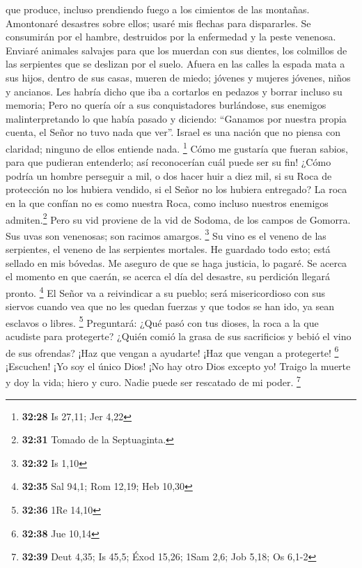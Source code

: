 que produce, incluso prendiendo fuego a los cimientos de las montañas.
 Amontonaré desastres sobre ellos; usaré mis flechas para
dispararles.  Se consumirán por el hambre, destruidos por
la enfermedad y la peste venenosa. Enviaré animales salvajes para que
los muerdan con sus dientes, los colmillos de las serpientes que se
deslizan por el suelo.  Afuera en las calles la espada
mata a sus hijos, dentro de sus casas, mueren de miedo; jóvenes y
mujeres jóvenes, niños y ancianos.  Les habría dicho que
iba a cortarlos en pedazos y borrar incluso su memoria; 
Pero no quería oír a sus conquistadores burlándose, sus enemigos
malinterpretando lo que había pasado y diciendo: ``Ganamos por nuestra
propia cuenta, el Señor no tuvo nada que ver''.  Israel
es una nación que no piensa con claridad; ninguno de ellos entiende
nada. \footnote{\textbf{32:28} Is 27,11; Jer 4,22}  Cómo
me gustaría que fueran sabios, para que pudieran entenderlo; así
reconocerían cuál puede ser su fin!  ¿Cómo podría un
hombre perseguir a mil, o dos hacer huir a diez mil, si su Roca de
protección no los hubiera vendido, si el Señor no los hubiera entregado?
 La roca en la que confían no es como nuestra Roca, como
incluso nuestros enemigos admiten.\footnote{\textbf{32:31} Tomado de la
  Septuaginta.}  Pero su vid proviene de la vid de
Sodoma, de los campos de Gomorra. Sus uvas son venenosas; son racimos
amargos. \footnote{\textbf{32:32} Is 1,10}  Su vino es el
veneno de las serpientes, el veneno de las serpientes mortales.
 He guardado todo esto; está sellado en mis bóvedas.
 Me aseguro de que se haga justicia, lo pagaré. Se acerca
el momento en que caerán, se acerca el día del desastre, su perdición
llegará pronto. \footnote{\textbf{32:35} Sal 94,1; Rom 12,19; Heb 10,30}
 El Señor va a reivindicar a su pueblo; será
misericordioso con sus siervos cuando vea que no les quedan fuerzas y
que todos se han ido, ya sean esclavos o libres. \footnote{\textbf{32:36}
  1Re 14,10}  Preguntará: ¿Qué pasó con tus dioses, la
roca a la que acudiste para protegerte?  ¿Quién comió la
grasa de sus sacrificios y bebió el vino de sus ofrendas? ¡Haz que
vengan a ayudarte! ¡Haz que vengan a protegerte! \footnote{\textbf{32:38}
  Jue 10,14}  ¡Escuchen! ¡Yo soy el único Dios! ¡No hay
otro Dios excepto yo! Traigo la muerte y doy la vida; hiero y curo.
Nadie puede ser rescatado de mi poder. \footnote{\textbf{32:39} Deut
  4,35; Is 45,5; Éxod 15,26; 1Sam 2,6; Job 5,18; Os 6,1-2}

